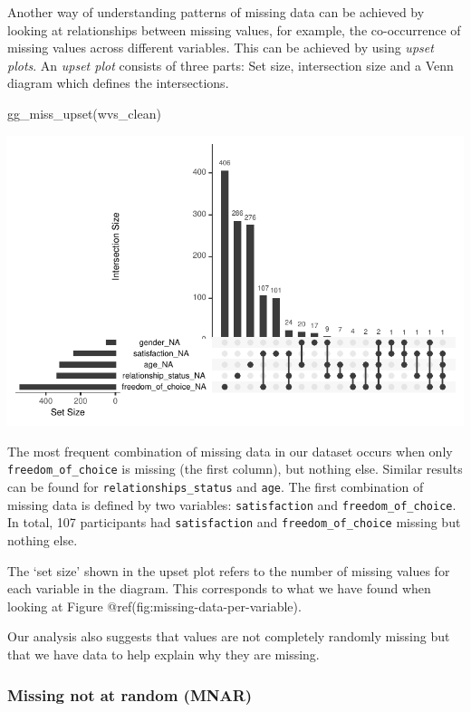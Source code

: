 \documentclass[
  letterpaper,
]{krantz}
\makeatletter
\newenvironment{Shaded}{\begin{snugshade}}{\end{snugshade}}
\newcommand{\FunctionTok}[1]{\textcolor[rgb]{0.28,0.35,0.67}{#1}}
\newcommand{\NormalTok}[1]{\textcolor[rgb]{0.00,0.23,0.31}{#1}}
\newenvironment{kframe}{%
\medskip{}
\setlength{\fboxsep}{.8em}
 \def\at@end@of@kframe{}%
 \ifinner\ifhmode%
  \def\at@end@of@kframe{\end{minipage}}%
  \begin{minipage}{\columnwidth}%
 \fi\fi%
 \def\FrameCommand##1{\hskip\@totalleftmargin \hskip-\fboxsep
 \colorbox{shadecolor}{##1}\hskip-\fboxsep
     \hskip-\linewidth \hskip-\@totalleftmargin \hskip\columnwidth}%
 \MakeFramed {\advance\hsize-\width
   \@totalleftmargin\z@ \linewidth\hsize
   \@setminipage}}%
 {\par\unskip\endMakeFramed%
 \at@end@of@kframe}
\renewenvironment{Shaded}{\begin{kframe}}{\end{kframe}}
\makeatother
\begin{document}
Another way of understanding patterns of missing data can be achieved by
looking at relationships between missing values, for example, the
co-occurrence of missing values across different variables. This can be
achieved by using \emph{upset plots}. An \emph{upset plot} consists of
three parts: Set size, intersection size and a Venn diagram which
defines the intersections.

\begin{Shaded}
\begin{Highlighting}[]
\FunctionTok{gg\_miss\_upset}\NormalTok{(wvs\_clean)}
\end{Highlighting}
\end{Shaded}

\includegraphics{07_data_wrangling_files/figure-pdf/upset-plot-1.pdf}

The most frequent combination of missing data in our dataset occurs when
only \texttt{freedom\_of\_choice} is missing (the first column), but
nothing else. Similar results can be found for
\texttt{relationships\_status} and \texttt{age}. The first combination
of missing data is defined by two variables: \texttt{satisfaction} and
\texttt{freedom\_of\_choice}. In total, 107 participants had
\texttt{satisfaction} and \texttt{freedom\_of\_choice} missing but
nothing else.

The `set size' shown in the upset plot refers to the number of missing
values for each variable in the diagram. This corresponds to what we
have found when looking at Figure @ref(fig:missing-data-per-variable).

Our analysis also suggests that values are not completely randomly
missing but that we have data to help explain why they are missing.

\subsubsection{Missing not at random
(MNAR)}\label{missing-not-at-random-mnar}
\end{document}
